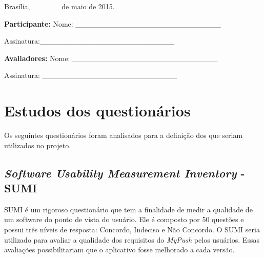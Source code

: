       \begin{flushright}
      
      Brasília, \_\_\_\_\_ de maio de 2015. 
      
      \textbf{Participante:}  Nome: \_\_\_\_\_\_\_\_\_\_\_\_\_\_\_\_\_\_\_\_\_\_\_\_\_\_\_ 
      
      Assinatura:\_\_\_\_\_\_\_\_\_\_\_\_\_\_\_\_\_\_\_\_\_\_\_\_\_  
      
        \textbf{Avaliadores:}  Nome: \_\_\_\_\_\_\_\_\_\_\_\_\_\_\_\_\_\_\_\_\_\_\_\_\_\_\_ 
        
         Assinatura: \_\_\_\_\_\_\_\_\_\_\_\_\_\_\_\_\_\_\_\_\_\_\_\_\_ 
      
       \end{flushright}
    
%   
%   
   
%


  \section{Estudos dos questionários}
    
    Os seguintes questionários foram analisados para a definição dos que seriam utilizados no projeto.
    
    \subsection{\textit{Software Usability Measurement Inventory} - SUMI}
      
      \nocite{summi}
      SUMI é um rigoroso questionário que tem a finalidade de medir a qualidade de um software do ponto de vista do usuário.
      Ele é composto por 50 questões e possui três níveis de resposta: Concordo, Indeciso e Não Concordo. O SUMI seria utilizado
      para avaliar a qualidade dos requisitos do \textit{MyPush} pelos usuários. Essas avaliações possibilitariam que o aplicativo fosse
      melhorado a cada versão.
      
